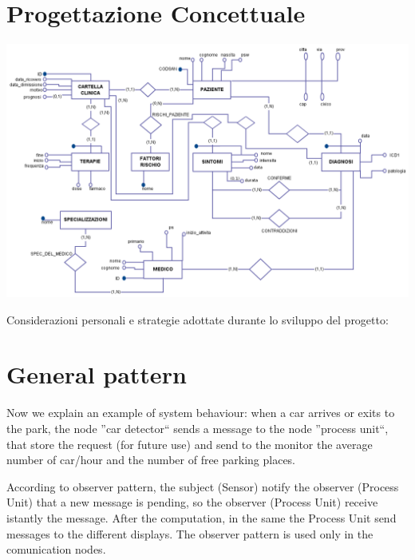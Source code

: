 \documentclass[a4paper,titlepage]{article}
\begin{document}
\begin{frontespizio}


\end{frontespizio}

\tableofcontents

\newpage

\part{Progettazione Concettuale}

    \begin{center}

    \centering
    \includegraphics[scale=0.40]{ER.png}

    \end{center}

Considerazioni personali e strategie adottate durante lo sviluppo del progetto:

\newpage
\part{General pattern}

Now we explain an example of system behaviour: when a car arrives or exits to the park, the node ''car detector`` sends a message to the node ''process unit``, that store the request (for future use) and send to the monitor the average number of car/hour and the number of free parking places.

According to observer pattern, the subject (Sensor) notify the observer (Process Unit) that a new message is pending, so the observer (Process Unit) receive istantly the message. After the computation, in the same the Process Unit send messages to the different displays.
The observer pattern is used only in the comunication nodes.
\end{document}
